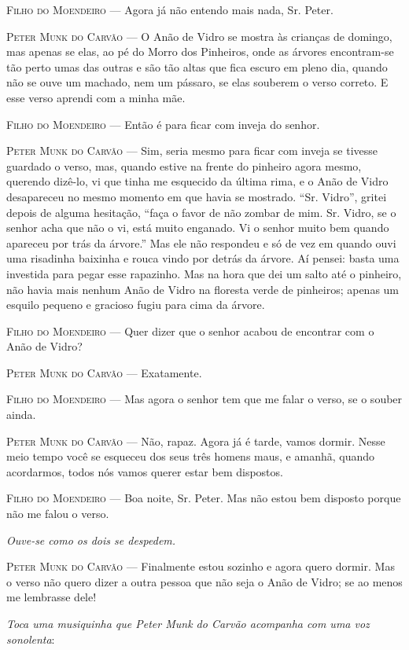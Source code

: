 \textsc{Filho do Moendeiro} --- Agora já não entendo mais nada, Sr. Peter.

\textsc{Peter Munk do Carvão} --- O Anão de Vidro se mostra às crianças de
domingo, mas apenas se elas, ao pé do Morro dos Pinheiros, onde as
árvores encontram-se tão perto umas das outras e são tão altas que fica
escuro em pleno dia, quando não se ouve um machado, nem um pássaro, se
elas souberem o verso correto. E esse verso aprendi com a minha mãe.

\textsc{Filho do Moendeiro} --- Então é para ficar com inveja do senhor.

\textsc{Peter Munk do Carvão} --- Sim, seria mesmo para ficar com inveja se
tivesse guardado o verso, mas, quando estive na frente do pinheiro agora
mesmo, querendo dizê-lo, vi que tinha me esquecido da última rima, e o
Anão de Vidro desapareceu no mesmo momento em que havia se mostrado.
``Sr. Vidro'', gritei depois de alguma hesitação, ``faça o favor de não
zombar de mim. Sr. Vidro, se o senhor acha que não o vi, está muito
enganado. Vi o senhor muito bem quando apareceu por trás da árvore.''
Mas ele não respondeu e só de vez em quando ouvi uma risadinha baixinha
e rouca vindo por detrás da árvore. Aí pensei: basta uma investida para
pegar esse rapazinho. Mas na hora que dei um salto até o pinheiro, não
havia mais nenhum Anão de Vidro na floresta verde de pinheiros; apenas
um esquilo pequeno e gracioso fugiu para cima da árvore.

\textsc{Filho do Moendeiro} --- Quer dizer que o senhor acabou de encontrar com o
Anão de Vidro?

\textsc{Peter Munk do Carvão} --- Exatamente.

\textsc{Filho do Moendeiro} --- Mas agora o senhor tem que me falar o verso, se o
souber ainda.

\textsc{Peter Munk do Carvão} --- Não, rapaz. Agora já é tarde, vamos dormir.
Nesse meio tempo você se esqueceu dos seus três homens maus, e amanhã,
quando acordarmos, todos nós vamos querer estar bem dispostos.

\textsc{Filho do Moendeiro} --- Boa noite, Sr. Peter. Mas não estou bem disposto
porque não me falou o verso.

\emph{Ouve-se como os dois se despedem.}

\textsc{Peter Munk do Carvão} --- Finalmente estou sozinho e agora quero dormir.
Mas o verso não quero dizer a outra pessoa que não seja o Anão de Vidro;
se ao menos me lembrasse dele!

\emph{Toca uma musiquinha que Peter Munk do Carvão acompanha com uma voz
sonolenta}:

